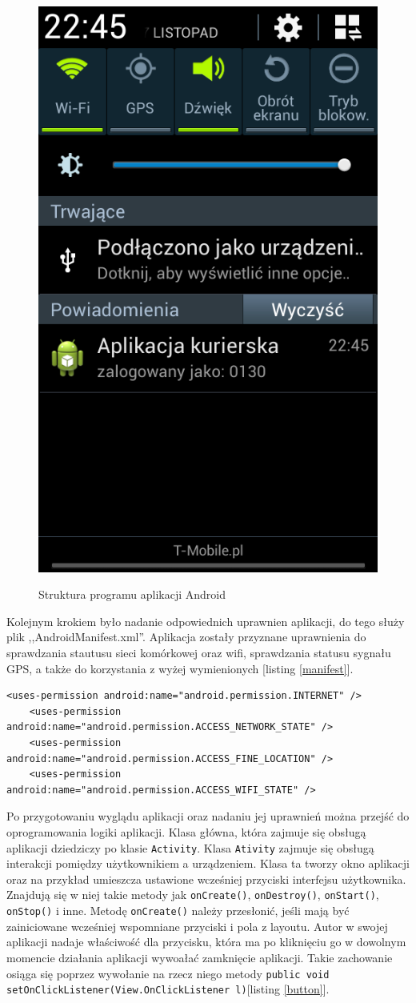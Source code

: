 \documentclass[eng,printmode,oneside]{mgr}
\begin{document}
\begin{figure}
{\includegraphics[width=25ex]{andBarZal.png}
\label{androidViewtask}
}
\vspace{-10pt}
 \caption{Struktura programu aplikacji Android}
\vspace{-10pt}

\end{figure}

Kolejnym krokiem było nadanie odpowiednich uprawnien aplikacji, do tego służy
plik ,,AndroidManifest.xml''. Aplikacja zostały przyznane uprawnienia do
sprawdzania stautusu sieci komórkowej oraz wifi, sprawdzania statusu sygnału
GPS, a także do korzystania z wyżej wymienionych [listing \ref{manifest}].

\begin{lstlisting}[caption=Nadanie uprawnień aplikacji Android,label=manifest]
	<uses-permission android:name="android.permission.INTERNET" />
	<uses-permission android:name="android.permission.ACCESS_NETWORK_STATE" />
	<uses-permission android:name="android.permission.ACCESS_FINE_LOCATION" />
	<uses-permission android:name="android.permission.ACCESS_WIFI_STATE" />
\end{lstlisting}


Po przygotowaniu wyglądu aplikacji oraz nadaniu jej uprawnień można przejść
do oprogramowania logiki aplikacji. Klasa główna, która zajmuje się obsługą
aplikacji dziedziczy po klasie \texttt{Activity}. Klasa \texttt{Ativity} zajmuje
się obsługą interakcji pomiędzy użytkownikiem a urządzeniem. Klasa ta tworzy okno aplikacji
oraz na przykład umieszcza ustawione wcześniej przyciski interfejsu użytkownika.
Znajdują się w niej takie metody jak \texttt{onCreate()}, \texttt{onDestroy()},
\texttt{onStart()}, \texttt{onStop()} i inne. Metodę \texttt{onCreate()} należy
przesłonić, jeśli mają być zainiciowane wcześniej wspomniane przyciski i pola z layoutu. Autor w swojej aplikacji nadaje
właściwość dla przycisku, która ma po kliknięciu go w dowolnym momencie
działania aplikacji wywoałać zamknięcie aplikacji. Takie zachowanie osiąga się
poprzez wywołanie na rzecz niego metody \texttt{public void
setOnClickListener(View.OnClickListener l)}[listing \ref{button}].
\end{document}
